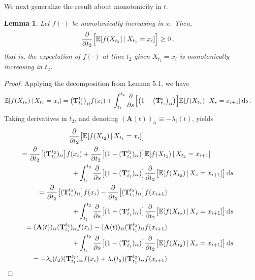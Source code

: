 \documentclass[10pt]{article}
\newtheorem{lemma}[theorem]{Lemma}
\newcommand{\dx}[1][x]{\text{\,d}#1}
\begin{document}
We next generalize the result about monotonicity in $t$.
\begin{lemma}
Let $f(\cdot)$ be monotonically increasing in $x$. Then,
\begin{equation*}
\frac{\partial}{\partial t_2}\Bigl[\mathbb{E}[f(X_{t_2})\,\vert\,X_{t_1}=x_i]\Bigr] \geq 0\,,
\end{equation*}
that is, the expectation of $f(\cdot)$ at time $t_2$ given $X_{t_1}=x_i$ is monotonically increasing in $t_2$.
\end{lemma}
\begin{proof}
Applying the decomposition from Lemma 5.1, we have
\begin{equation*}
\mathbb{E}[f(X_{t_2})\,\vert\,X_{t_1}=x_i] = \bigl(\mathbf{T}_{t_1}^{t_2}\bigr)_{ii}f(x_i) + \int_{t_1}^{t_2} \frac{\partial}{\partial s}\Bigl[\bigl(1-\bigl(\mathbf{T}_{t_1}^s\bigr)_{ii}\bigr)\Bigr]\mathbb{E}[f(X_{t_2})\,\vert\,X_s=x_{i+1}]\dx[s]\,.
\end{equation*}
Taking derivatives in $t_2$, and denoting $(\mathbf{A}(t))_{ii}\equiv-\lambda_i(t)$, yields
\begin{align*}
\frac{\partial}{\partial t_2}\bigl[\mathbb{E}[f(X_{t_2})\,\vert\,X_{t_1}=x_i]\bigr] & \\
= \frac{\partial}{\partial t_2}\bigl[(\mathbf{T}_{t_1}^{t_2})_{ii}\bigr]f(x_i) + \frac{\partial}{\partial t_2}\bigl[(1-(\mathbf{T}_{t_1}^{t_2})_{ii})\bigr]&\mathbb{E}[f(X_{t_2})\,\vert\,X_{t_2}=x_{i+1}] \\
+ \int_{t_1}^{t_2} \frac{\partial}{\partial s}\bigl[(1-(\mathbf{T}_{t_1}^{s})_{ii})\bigr]&\frac{\partial}{\partial t_2}\bigl[\mathbb{E}[f(X_{t_2})\,\vert\,X_s=x_{i+1}]\bigr]\dx[s] \\
 = \frac{\partial}{\partial t_2}\bigl[(\mathbf{T}_{t_1}^{t_2})_{ii}\bigr]f(x_i) - \frac{\partial}{\partial t_2}\bigl[(\mathbf{T}_{t_1}^{t_2})_{ii}\bigr]&f(x_{i+1}) \\
+ \int_{t_1}^{t_2} \frac{\partial}{\partial s}\bigl[(1-(\mathbf{T}_{t_1}^s)_{ii})\bigr]&\frac{\partial}{\partial t_2}\bigl[\mathbb{E}[f(X_{t_2})\,\vert\,X_s=x_{i+1}]\bigr]\dx[s] \\
 = (\mathbf{A}(t))_{ii}(\mathbf{T}_{t_1}^{t_2})_{ii}f(x_i) - (\mathbf{A}(t))_{ii}(\mathbf{T}_{t_1}^{t_2})_{ii}&f(x_{i+1}) \\
+ \int_{t_1}^{t_2} \frac{\partial}{\partial s}\bigl[(1-(\mathbf{T}_{t_1}^s)_{ii})\bigr]&\frac{\partial}{\partial t_2}\bigl[\mathbb{E}[f(X_{t_2})\,\vert\,X_s=x_{i+1}]\bigr]\dx[s] \\
 = -\lambda_i(t_2)(\mathbf{T}_{t_1}^{t_2})_{ii}f(x_i) + \lambda_i(t_2)(\mathbf{T}_{t_1}^{t_2})_{ii}&f(x_{i+1}) \\

\end{align*}
\end{proof}
\end{document}

